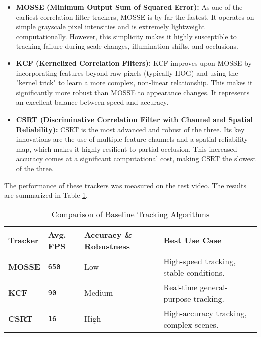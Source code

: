 \documentclass[12pt, a4paper]{article}
\begin{document}
\begin{itemize}
    \item \textbf{MOSSE (Minimum Output Sum of Squared Error):} As one of the earliest correlation filter trackers, MOSSE is by far the fastest. It operates on simple grayscale pixel intensities and is extremely lightweight computationally. However, this simplicity makes it highly susceptible to tracking failure during scale changes, illumination shifts, and occlusions.
    
    \item \textbf{KCF (Kernelized Correlation Filters):} KCF improves upon MOSSE by incorporating features beyond raw pixels (typically HOG) and using the "kernel trick" to learn a more complex, non-linear relationship. This makes it significantly more robust than MOSSE to appearance changes. It represents an excellent balance between speed and accuracy.

    \item \textbf{CSRT (Discriminative Correlation Filter with Channel and Spatial Reliability):} CSRT is the most advanced and robust of the three. Its key innovations are the use of multiple feature channels and a spatial reliability map, which makes it highly resilient to partial occlusion. This increased accuracy comes at a significant computational cost, making CSRT the slowest of the three.
\end{itemize}

The performance of these trackers was measured on the test video. The results are summarized in Table \ref{tab:tracker_comparison}.

\begin{table}[H]
    \centering
    \caption{Comparison of Baseline Tracking Algorithms}
    \label{tab:tracker_comparison}
    \begin{tabularx}{\textwidth}{@{}llXX@{}} %
        \toprule
        \textbf{Tracker} & \textbf{Avg. FPS} & \textbf{Accuracy \& Robustness} & \textbf{Best Use Case} \\
        \midrule
        \textbf{MOSSE} & \texttt{650} & Low & High-speed tracking, stable conditions. \\
        \addlinespace %
        \textbf{KCF} & \texttt{90} & Medium & Real-time general-purpose tracking. \\
        \addlinespace
        \textbf{CSRT} & \texttt{16} & High & High-accuracy tracking, complex scenes. \\
        \bottomrule
    \end{tabularx}
\end{table}
\end{document}
